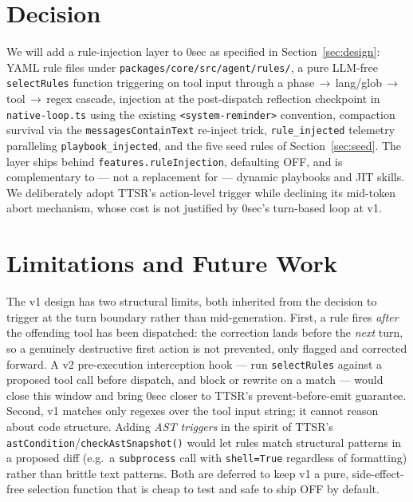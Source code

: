 \documentclass[11pt]{article}
\begin{document}
\section{Decision}
\label{sec:decision}

We will add a rule-injection layer to 0sec as specified in
Section~\ref{sec:design}: YAML rule files under
\texttt{packages/core/src/agent/rules/}, a pure LLM-free \texttt{selectRules}
function triggering on tool input through a phase\,$\rightarrow$\,lang/glob\,$\rightarrow$\,tool\,$\rightarrow$\,regex
cascade, injection at the post-dispatch reflection checkpoint in
\texttt{native-loop.ts} using the existing \texttt{<system-reminder>} convention,
compaction survival via the \texttt{messagesContainText} re-inject trick,
\texttt{rule\_injected} telemetry paralleling \texttt{playbook\_injected}, and the
five seed rules of Section~\ref{sec:seed}. The layer ships behind
\texttt{features.ruleInjection}, defaulting OFF, and is complementary to --- not a
replacement for --- dynamic playbooks and JIT skills. We deliberately adopt
TTSR's action-level trigger while declining its mid-token abort mechanism, whose
cost is not justified by 0sec's turn-based loop at v1.

\section{Limitations and Future Work}
\label{sec:future}

The v1 design has two structural limits, both inherited from the decision to
trigger at the turn boundary rather than mid-generation. First, a rule fires
\emph{after} the offending tool has been dispatched: the correction lands before
the \emph{next} turn, so a genuinely destructive first action is not prevented,
only flagged and corrected forward. A v2 pre-execution interception hook --- run
\texttt{selectRules} against a proposed tool call before dispatch, and block or
rewrite on a match --- would close this window and bring 0sec closer to TTSR's
prevent-before-emit guarantee. Second, v1 matches only regexes over the tool
input string; it cannot reason about code structure. Adding \emph{AST triggers}
in the spirit of TTSR's \texttt{astCondition}/\texttt{checkAstSnapshot()} would
let rules match structural patterns in a proposed diff (e.g.\ a
\texttt{subprocess} call with \texttt{shell=True} regardless of formatting)
rather than brittle text patterns. Both are deferred to keep v1 a pure,
side-effect-free selection function that is cheap to test and safe to ship OFF by
default.
\end{document}
